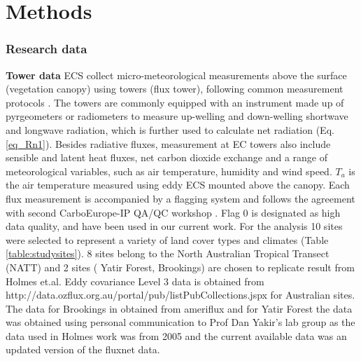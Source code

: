 \documentclass[fleqn,10pt]{wlscirep}
\begin{document}
{ 








\section{Methods} 
\subsubsection{Research data}
\textbf{Tower data}
ECS collect micro-meteorological measurements above the surface (vegetation canopy) using towers (flux tower), following common measurement protocols \cite{baldocchi2001fluxnet}. The towers are commonly equipped with an instrument made up of pyrgeometers or radiometers to measure up-welling and down-welling shortwave and longwave radiation, which is further used to calculate net radiation (Eq. \ref{eq_Rn1}). Besides radiative fluxes, measurement at EC towers also include sensible and latent heat fluxes, net carbon dioxide exchange and a range of meteorological variables, such as air temperature, humidity and wind speed. $T_{a}$ is the air temperature measured using eddy ECS mounted above the canopy. Each flux measurement is accompanied by a flagging system and follows the agreement with second CarboEurope-IP QA/QC workshop \cite{foken2004post}. Flag 0 is designated as high data quality, and have been used in our current work. For the analysis 10 sites were selected to represent a variety of land cover types and climates (Table \ref{table:studysites}). 8 sites belong to the North Australian Tropical Transect (NATT) and 2 sites ( Yatir Forest, Brookings) are  chosen to replicate result from Holmes et.al\cite{holmes_land_2009-1}. Eddy covariance Level 3 data is obtained from http://data.ozflux.org.au/portal/pub/listPubCollections.jspx for Australian sites. The data for Brookings in obtained from ameriflux and for Yatir Forest the data was obtained using personal communication to Prof Dan Yakir's lab group as the data used in Holmes work  was from 2005 \cite{holmes_land_2009} and the current available data was an updated version of the fluxnet data.%

}
\end{document}
